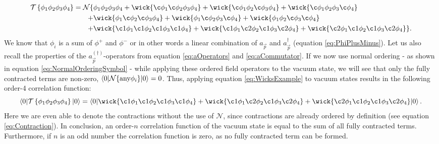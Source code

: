\begin{align}
    \mathcal{T}\left\{ \phi_1\phi_2\phi_3\phi_4 \right\} = \mathcal{N} \{ &\phi_1\phi_2\phi_3\phi_4 + \wick{\c\phi_1\c\phi_2\phi_3\phi_4} + \wick{\c\phi_1\phi_2\c\phi_3\phi_4} + \wick{\c\phi_1\phi_2\phi_3\c\phi_4} \nonumber \\ 
    + & \wick{\phi_1\c\phi_2\c\phi_3\phi_4} + \wick{\phi_1\c\phi_2\phi_3\c\phi_4} + \wick{\phi_1\phi_2\c\phi_3\c\phi_4} \label{eq:WicksExample} \\
    + & \wick{\c1\phi_1\c1\phi_2\c1\phi_3\c1\phi_4} + \wick{\c1\phi_1\c2\phi_2\c1\phi_3\c2\phi_4} + \wick{\c2\phi_1\c1\phi_2\c1\phi_3\c2\phi_4} \}. \nonumber
\end{align}
We know that $\phi_i$ is a sum of $\phi^+$ and $\phi^-$ or in other words a linear combination of $a_{\vec{p}}$ and $a_{\vec{p}}^\dagger$ (equation \ref{eq:PhiPlusMinus}). Let us also recall the properties of the $a_{\vec{p}}^{(\dagger)}$-operators from equation \ref{eq:aOperators} and \ref{eq:aCommutator}. If we now use normal ordering - as shown in equation \ref{eq:NormalOrderingSymbol} - while applying these ordered field operators to the vacuum state, we will see that only the fully contracted terms are non-zero, \ie $\braket{0|\mathcal{N}\{ \text{any} \phi_i \}|0} = 0$. Thus, applying equation \ref{eq:WicksExample} to vacuum states results in the following order-4 correlation function:
\begin{equation}\label{eq:WicksExampleVacuum}
    \braket{0|\mathcal{T}\left\{ \phi_1\phi_2\phi_3\phi_4 \right\}|0} = \braket{0| \wick{\c1\phi_1\c1\phi_2\c1\phi_3\c1\phi_4} + \wick{\c1\phi_1\c2\phi_2\c1\phi_3\c2\phi_4} + \wick{\c2\phi_1\c1\phi_2\c1\phi_3\c2\phi_4} |0}.
\end{equation}
Here we are even able to denote the contractions without the use of $\mathcal{N}$, since contractions are already ordered by definition (see equation \ref{eq:Contraction}). In conclusion, an order-$n$ correlation function of the vacuum state is equal to the sum of all fully contracted terms. Furthermore, if $n$ is an odd number the correlation function is zero, as no fully contracted term can be formed.

